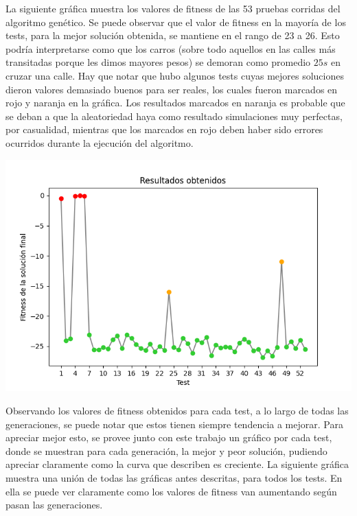 \documentclass[colorinlistoftodos,twoside,twocolumn]{article} %
\begin{document}
	La siguiente gr\'afica muestra los valores de fitness de las 53 pruebas corridas del algoritmo gen\'etico. Se puede observar que el valor de fitness en la mayor\'ia de los tests, para la mejor soluci\'on obtenida, se mantiene en el rango de 23 a 26. Esto podr\'ia interpretarse como que los carros (sobre todo aquellos en las calles m\'as transitadas porque les dimos mayores pesos) se demoran como promedio $25s$ en cruzar una calle. Hay que notar que hubo algunos tests cuyas mejores soluciones dieron valores demasiado buenos para ser reales, los cuales fueron marcados en rojo y naranja en la gr\'afica. Los resultados marcados en naranja es probable que se deban a que la aleatoriedad haya como resultado simulaciones muy perfectas, por casualidad, mientras que los marcados en rojo deben haber sido errores ocurridos durante la ejecuci\'on del algoritmo.
	
	\begin{center}
		\includegraphics[width=\columnwidth]{graphic_resultados_obtenidos.png}
	\end{center}

	Observando los valores de fitness obtenidos para cada test, a lo largo de todas las generaciones, se puede notar que estos tienen siempre tendencia a mejorar. Para apreciar mejor esto, se provee junto con este trabajo un gr\'afico por cada test, donde se muestran para cada generaci\'on, la mejor y peor soluci\'on, pudiendo apreciar claramente como la curva que describen es creciente. La siguiente gr\'afica muestra una uni\'on de todas las gr\'aficas antes descritas, para todos los tests. En ella se puede ver claramente como los valores de fitness van aumentando seg\'un pasan las generaciones.
\end{document}
